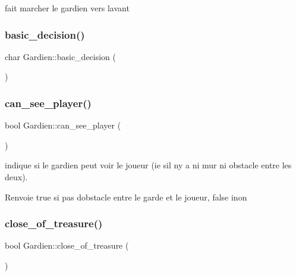 fait marcher le gardien vers l\textquotesingle{}avant 

\mbox{\label{classGardien_afd0c3eba7264ae8fce2f92cae359dfdb}} 
\subsubsection{\texorpdfstring{basic\+\_\+decision()}{basic\_decision()}}
{\footnotesize\ttfamily char Gardien\+::basic\+\_\+decision (\begin{DoxyParamCaption}{ }\end{DoxyParamCaption})\hspace{0.3cm}{\ttfamily [private]}}

\mbox{\label{classGardien_ab4cae0375789f78258d37ccb16004a4d}} 
\subsubsection{\texorpdfstring{can\+\_\+see\+\_\+player()}{can\_see\_player()}}
{\footnotesize\ttfamily bool Gardien\+::can\+\_\+see\+\_\+player (\begin{DoxyParamCaption}{ }\end{DoxyParamCaption})\hspace{0.3cm}{\ttfamily [private]}}



indique si le gardien peut voir le joueur (ie s\textquotesingle{}il n\textquotesingle{}y a ni mur ni obstacle entre les deux). 

\begin{DoxyReturn}{Renvoie}
true si pas d\textquotesingle{}obstacle entre le garde et le joueur, false inon 
\end{DoxyReturn}
\mbox{\label{classGardien_a8563417984b4aa5416ade0d8650e5f00}} 
\subsubsection{\texorpdfstring{close\+\_\+of\+\_\+treasure()}{close\_of\_treasure()}}
{\footnotesize\ttfamily bool Gardien\+::close\+\_\+of\+\_\+treasure (\begin{DoxyParamCaption}{ }\end{DoxyParamCaption})\hspace{0.3cm}{\ttfamily [private]}}



